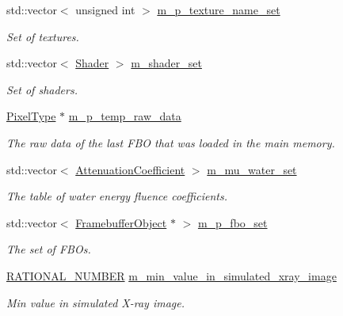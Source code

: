 \begin{DoxyCompactItemize}
std::vector$<$ unsigned int $>$ \hyperlink{classg_virtual_x_ray_1_1_x_ray_renderer_a1075d6644118669ee6948eab5ee82f85}{m\_\-p\_\-texture\_\-name\_\-set}
\begin{DoxyCompactList}\small\item\em Set of textures. \end{DoxyCompactList}\item 
std::vector$<$ \hyperlink{class_graphics_1_1_shader}{Shader} $>$ \hyperlink{classg_virtual_x_ray_1_1_x_ray_renderer_a737acc3cdfe28c3db90dfd69dce0a203}{m\_\-shader\_\-set}
\begin{DoxyCompactList}\small\item\em Set of shaders. \end{DoxyCompactList}\item 
\hyperlink{classg_virtual_x_ray_1_1_x_ray_renderer_a1337efbad4ecdc7ea0054b187590596d}{PixelType} $\ast$ \hyperlink{classg_virtual_x_ray_1_1_x_ray_renderer_ad6c887c8da3342dffaa237115e9b933d}{m\_\-p\_\-temp\_\-raw\_\-data}
\begin{DoxyCompactList}\small\item\em The raw data of the last FBO that was loaded in the main memory. \end{DoxyCompactList}\item 
std::vector$<$ \hyperlink{classg_virtual_x_ray_1_1_attenuation_coefficient}{AttenuationCoefficient} $>$ \hyperlink{classg_virtual_x_ray_1_1_x_ray_renderer_a26aff3c3fd71edffc1559635eae312f3}{m\_\-mu\_\-water\_\-set}
\begin{DoxyCompactList}\small\item\em The table of water energy fluence coefficients. \end{DoxyCompactList}\item 
std::vector$<$ \hyperlink{class_framebuffer_object}{FramebufferObject} $\ast$ $>$ \hyperlink{classg_virtual_x_ray_1_1_x_ray_renderer_ac3df573e0519dd9809dbf5e7e762f796}{m\_\-p\_\-fbo\_\-set}
\begin{DoxyCompactList}\small\item\em The set of FBOs. \end{DoxyCompactList}\item 
\hyperlink{namespace_utilities_a40969b96bd8d847b962e297cb79f08ce}{RATIONAL\_\-NUMBER} \hyperlink{classg_virtual_x_ray_1_1_x_ray_renderer_a350d7524f24139e16a4beebf16551d52}{m\_\-min\_\-value\_\-in\_\-simulated\_\-xray\_\-image}
\begin{DoxyCompactList}\small\item\em Min value in simulated X-\/ray image. \end{DoxyCompactList}\item 

\end{DoxyCompactItemize}

